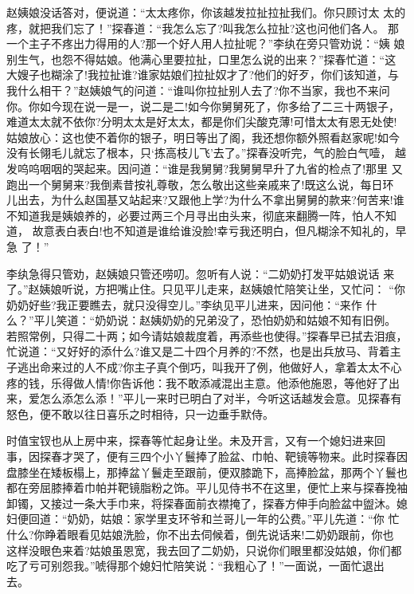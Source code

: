 赵姨娘没话答对，便说道：“太太疼你，你该越发拉扯拉扯我们。你只顾讨太
太的疼，就把我们忘了！”探春道：“我怎么忘了?叫我怎么拉扯?这也问他们各人。
那一个主子不疼出力得用的人?那一个好人用人拉扯呢？”李纨在旁只管劝说：“姨
娘别生气，也怨不得姑娘。他满心里要拉扯，口里怎么说的出来？”探春忙道：“这
大嫂子也糊涂了!我拉扯谁?谁家姑娘们拉扯奴才了?他们的好歹，你们该知道，与
我什么相干？”赵姨娘气的问道：“谁叫你拉扯别人去了?你不当家，我也不来问
你。你如今现在说一是一，说二是二!如今你舅舅死了，你多给了二三十两银子，
难道太太就不依你?分明太太是好太太，都是你们尖酸克薄!可惜太太有恩无处使!
姑娘放心：这也使不着你的银子，明日等出了阁，我还想你额外照看赵家呢!如今
没有长翎毛儿就忘了根本，只‘拣高枝儿飞’去了。”探春没听完，气的脸白气噎，
越发呜呜咽咽的哭起来。因问道：“谁是我舅舅?我舅舅早升了九省的检点了!那里
又跑出一个舅舅来?我倒素昔按礼尊敬，怎么敬出这些亲戚来了!既这么说，每日环
儿出去，为什么赵国基又站起来?又跟他上学?为什么不拿出舅舅的款来?何苦来!谁
不知道我是姨娘养的，必要过两三个月寻出由头来，彻底来翻腾一阵，怕人不知道，
故意表白表白!也不知道是谁给谁没脸!幸亏我还明白，但凡糊涂不知礼的，早急
了！”

李纨急得只管劝，赵姨娘只管还唠叨。忽听有人说：“二奶奶打发平姑娘说话
来了。”赵姨娘听说，方把嘴止住。只见平儿走来，赵姨娘忙陪笑让坐，又忙问：
“你奶奶好些?我正要瞧去，就只没得空儿。”李纨见平儿进来，因问他：“来作
什么？”平儿笑道：“奶奶说：赵姨奶奶的兄弟没了，恐怕奶奶和姑娘不知有旧例。
若照常例，只得二十两；如今请姑娘裁度着，再添些也使得。”探春早已拭去泪痕，
忙说道：“又好好的添什么?谁又是二十四个月养的?不然，也是出兵放马、背着主
子逃出命来过的人不成?你主子真个倒巧，叫我开了例，他做好人，拿着太太不心
疼的钱，乐得做人情!你告诉他：我不敢添减混出主意。他添他施恩，等他好了出
来，爱怎么添怎么添！”平儿一来时已明白了对半，今听这话越发会意。见探春有
怒色，便不敢以往日喜乐之时相待，只一边垂手默侍。

时值宝钗也从上房中来，探春等忙起身让坐。未及开言，又有一个媳妇进来回
事，因探春才哭了，便有三四个小丫鬟捧了脸盆、巾帕、靶镜等物来。此时探春因
盘膝坐在矮板榻上，那捧盆丫鬟走至跟前，便双膝跪下，高捧脸盆，那两个丫鬟也
都在旁屈膝捧着巾帕并靶镜脂粉之饰。平儿见侍书不在这里，便忙上来与探春挽袖
卸镯，又接过一条大手巾来，将探春面前衣襟掩了，探春方伸手向脸盆中盥沐。媳
妇便回道：“奶奶，姑娘：家学里支环爷和兰哥儿一年的公费。”平儿先道：“你
忙什么?你睁着眼看见姑娘洗脸，你不出去伺候着，倒先说话来!二奶奶跟前，你也
这样没眼色来着?姑娘虽恩宽，我去回了二奶奶，只说你们眼里都没姑娘，你们都
吃了亏可别怨我。”唬得那个媳妇忙陪笑说：“我粗心了！”一面说，一面忙退出
去。

